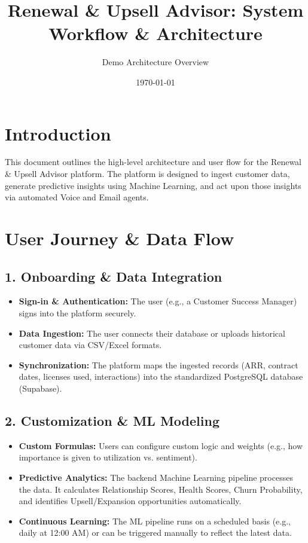 \documentclass[12pt,a4paper]{article}
\title{\textbf{Renewal \& Upsell Advisor: System Workflow \& Architecture}}
\author{Demo Architecture Overview}
\date{\today}
\begin{document}
\maketitle

\section{Introduction}
This document outlines the high-level architecture and user flow for the Renewal \& Upsell Advisor platform. The platform is designed to ingest customer data, generate predictive insights using Machine Learning, and act upon those insights via automated Voice and Email agents.

\section{User Journey \& Data Flow}

\subsection{1. Onboarding \& Data Integration}
\begin{itemize}
    \item \textbf{Sign-in \& Authentication:} The user (e.g., a Customer Success Manager) signs into the platform securely.
    \item \textbf{Data Ingestion:} The user connects their database or uploads historical customer data via CSV/Excel formats. 
    \item \textbf{Synchronization:} The platform maps the ingested records (ARR, contract dates, licenses used, interactions) into the standardized PostgreSQL database (Supabase).
\end{itemize}

\subsection{2. Customization \& ML Modeling}
\begin{itemize}
    \item \textbf{Custom Formulas:} Users can configure custom logic and weights (e.g., how importance is given to utilization vs. sentiment).
    \item \textbf{Predictive Analytics:} The backend Machine Learning pipeline processes the data. It calculates Relationship Scores, Health Scores, Churn Probability, and identifies Upsell/Expansion opportunities automatically.
    \item \textbf{Continuous Learning:} The ML pipeline runs on a scheduled basis (e.g., daily at 12:00 AM) or can be triggered manually to reflect the latest data.
\end{itemize}
\end{document}

